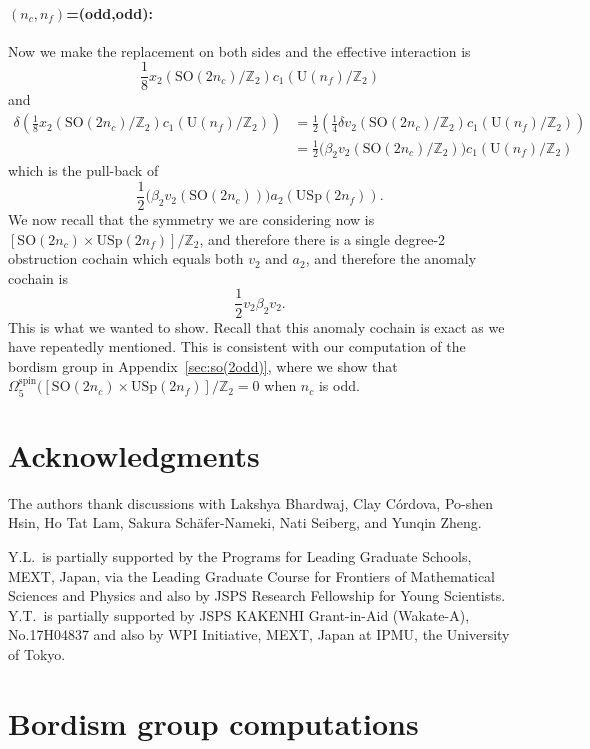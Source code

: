 \documentclass[12pt]{article}
\numberwithin{equation}{section}
\def\bZ{\mathbb{Z}}
\def\U{\mathrm{U}}
\def\SO{\mathrm{SO}}
\def\USp{\mathrm{USp}}
\begin{document}
\paragraph{$(n_c,n_f)$=(odd,odd):}
Now we make the replacement on both sides and the effective interaction is \begin{equation}
\frac18 x_2(\SO(2n_c)/\bZ_2) c_1(\U(n_f)/\bZ_2) 
\end{equation}
and \begin{align}
\delta\left(\frac18 x_2(\SO(2n_c)/\bZ_2) c_1(\U(n_f)/\bZ_2) \right)
&= \frac12 \left(\frac14\delta v_2(\SO(2n_c)/\bZ_2) c_1(\U(n_f)/\bZ_2) \right) \\
&= \frac12 \Big(\beta_2 v_2(\SO(2n_c)/\bZ_2)\Big)c_1(\U(n_f)/\bZ_2) 
\end{align}
which is the pull-back of \begin{equation}
 \frac12 \Big(\beta_2 v_2(\SO(2n_c))\Big)a_2(\USp(2n_f)).
\end{equation}
We now recall that the symmetry we are considering now is $[\SO(2n_c)\times \USp(2n_f)]/\bZ_2$,
and therefore there is a single degree-2 obstruction cochain which equals both $v_2$ and $a_2$,
and therefore the anomaly cochain is \begin{equation}
 \frac12 v_2\beta_2 v_2.
\end{equation}
This is what we wanted to show.
Recall that this anomaly cochain is exact as we have repeatedly mentioned.
This is consistent with our computation of the bordism group in Appendix~\ref{sec:so(2odd)},
where we show that $\Omega^\text{spin}_5([\SO(2n_c)\times \USp(2n_f)]/\bZ_2=0$ when $n_c$ is odd.

\section*{Acknowledgments}
The authors thank discussions with 
Lakshya Bhardwaj,
Clay C\'ordova,
Po-shen Hsin,
Ho Tat Lam,
Sakura Sch\"afer-Nameki,
Nati Seiberg,
and Yunqin Zheng.

Y.L.~is partially supported by the Programs for Leading Graduate Schools, MEXT, Japan, via the Leading Graduate Course for Frontiers of Mathematical Sciences and Physics
and also by JSPS Research Fellowship for Young Scientists.
Y.T.~is partially supported  by JSPS KAKENHI Grant-in-Aid (Wakate-A), No.17H04837 
and also by WPI Initiative, MEXT, Japan at IPMU, the University of Tokyo.


\appendix
\section{Bordism group computations}
\label{sec:bordism}
\end{document}
